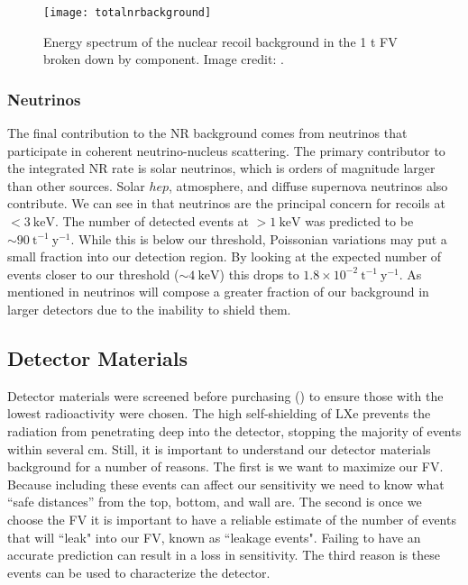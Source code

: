 \begin{figure}
\centering
\texttt{[image: totalnrbackground]}
\caption{Energy spectrum of the nuclear recoil background in the 1 t FV broken down by component.  Image credit: .}
\label{fig:backgrounds_nuclear_muon_induced_nr_rate}
\end{figure}



\subsubsection{Neutrinos}
\label{subsubsec:backgrounds_nuclear_neutrinos}
The final contribution to the NR background comes from neutrinos that participate in coherent neutrino-nucleus scattering.  The primary
contributor to the integrated NR rate is solar  neutrinos, which is orders of magnitude larger than other sources.  Solar $hep$,
atmosphere, and diffuse supernova neutrinos also contribute.  We can see in
 that neutrinos are the principal concern for recoils at $< 3\ \mathrm{keV}$.  The
number of detected events at $> 1\ \mathrm{keV}$ was predicted to be ${\sim} 90\ \mathrm{t^{-1}\ y^{-1}}$.  While this is below our
threshold, Poissonian variations may put a small fraction into our detection region.  By looking at the expected number of events closer
to our threshold (${\sim} 4\ \mathrm{keV}$) this drops to $1.8 \times 10^{-2}\ \mathrm{t^{-1}\ y^{-1}}$.  As mentioned in
 neutrinos will compose a greater fraction of our background in larger detectors
due to the inability to shield them.



\subsection{Detector Materials}
\label{subsec:backgrounds_detector_materials}
Detector materials were screened before purchasing () to ensure
those with the lowest radioactivity were chosen.  The high self-shielding of LXe prevents the radiation from penetrating deep into
the detector, stopping the majority of events within several cm.  Still, it is important to understand our detector materials background
for a number of
reasons.  The first is we want to maximize our FV.  Because including these events can affect our sensitivity we need to know
what ``safe distances'' from the top, bottom, and wall are.  The second is once we choose the FV it is important to have a reliable
estimate
of the number of events that will ``leak" into our FV, known as ``leakage events".  Failing to have an accurate prediction can result in
a loss in sensitivity.  The third reason is these events can be used to characterize the detector.

